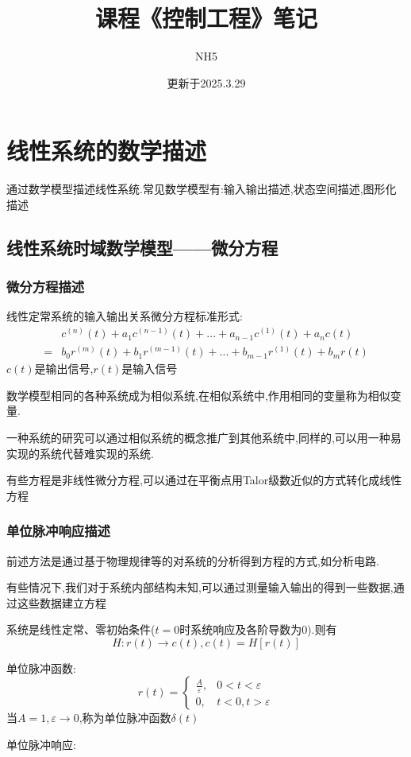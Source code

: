 \documentclass[12pt,a4paper,oneside]{ctexart}
\title{课程《控制工程》笔记}
\author{NH5}
\date{更新于2025.3.29}
\begin{document}
\maketitle
\section{线性系统的数学描述}
通过数学模型描述线性系统.常见数学模型有:输入输出描述,状态空间描述,图形化描述

\subsection{线性系统时域数学模型——微分方程}
\subsubsection{微分方程描述}
线性定常系统的输入输出关系微分方程标准形式:
\begin{align*}
    &c^{(n)}(t) + a_1c^{(n-1)}(t) + ... + a_{n-1}c^{(1)}(t) + a_nc(t)\\
    = &b_0r^{(m)}(t) + b_1r^{(m-1)}(t) + ... + b_{m-1}r^{(1)}(t) + b_mr(t)
\end{align*}
$c(t)$是输出信号,$r(t)$是输入信号

数学模型相同的各种系统成为相似系统,在相似系统中,作用相同的变量称为相似变量.

一种系统的研究可以通过相似系统的概念推广到其他系统中,同样的,可以用一种易实现的系统代替难实现的系统.

有些方程是非线性微分方程,可以通过在平衡点用Talor级数近似的方式转化成线性方程

\subsubsection{单位脉冲响应描述}
前述方法是通过基于物理规律等的对系统的分析得到方程的方式,如分析电路.

有些情况下,我们对于系统内部结构未知,可以通过测量输入输出的得到一些数据,通过这些数据建立方程

系统是线性定常、零初始条件($t=0$时系统响应及各阶导数为$0$).则有
\[
    H:r(t) \to c(t),c(t) = H[r(t)]
\]

单位脉冲函数:
\[
    r(t)=\begin{cases}
        \frac{A}{\varepsilon}, &0<t<\varepsilon \\
        0, & t<0,t>\varepsilon
    \end{cases}
\]
当$A=1,\varepsilon \to 0$,称为单位脉冲函数$\delta(t)$

单位脉冲响应:
\end{document}
